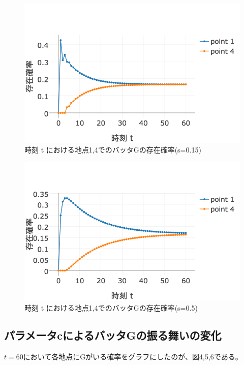 \documentclass[11pt]{ltjsarticle}
\begin{document}
	\begin{figure}
  		\includegraphics[width=\textwidth]{fig2.png}
  		\caption{時刻 t における地点1,4でのバッタGの存在確率(s=0.15)}
	\end{figure}

	\begin{figure}
  		\includegraphics[width=\textwidth]{fig3.png}
  		\caption{時刻 t における地点1,4でのバッタGの存在確率(s=0.5)}
	\end{figure}

\subsection{パラメータcによるバッタGの振る舞いの変化}
	$t=60$において各地点にGがいる確率をグラフにしたのが、図4,5,6である。
\end{document}
